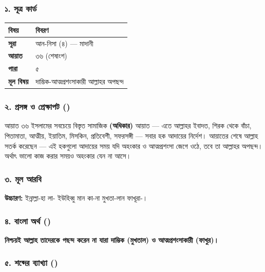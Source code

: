 \subsubsection*{১. সূত্র কার্ড}

\begin{table}[h]\centering\small
\begin{tabular}{ll}
বিষয় & বিবরণ \\
\hline
\textbf{সূরা} & আন-নিসা (৪) — মাদানী \\
\textbf{আয়াত} & ৩৬ (শেষাংশ) \\
\textbf{পারা} & ৫ \\
\textbf{মূল বিষয়} & দাম্ভিক-আত্মপ্রশংসাকারী আল্লাহর অপছন্দ \\
\hline
\end{tabular}
\end{table}

\subsubsection*{২. প্রসঙ্গ ও প্রেক্ষাপট ()}

আয়াত ৩৬ ইসলামের সবচেয়ে বিস্তৃত সামাজিক \textbf{ (অধিকার)} আয়াত — এতে আল্লাহর ইবাদত, শিরক থেকে বাঁচা, পিতামাতা, আত্মীয়, ইয়াতিম, মিসকিন, প্রতিবেশী, সফরসঙ্গী — সবার হক আদায়ের নির্দেশ। আয়াতের শেষে আল্লাহ সতর্ক করেছেন — এই হকগুলো আদায়ের সময় যদি অহংকার ও আত্মপ্রশংসা জেগে ওঠে, তবে তা আল্লাহর অপছন্দ। অর্থাৎ ভালো কাজ করার সময়ও অহংকার যেন না আসে।

\subsubsection*{৩. মূল আরবি}
\begin{center}\end{center}
\textbf{উচ্চারণ:} ইন্নাল্লা-হা লা- ইউহিব্বু মান কা-না মুখতা-লান ফাখূরা-।

\subsubsection*{৪. বাংলা অর্থ ()}
\textbf{নিশ্চয়ই আল্লাহ তাদেরকে পছন্দ করেন না যারা দাম্ভিক (মুখতাল) ও আত্মপ্রশংসাকারী (ফাখুর)।}

\subsubsection*{৫. শব্দের ব্যাখ্যা ()}

